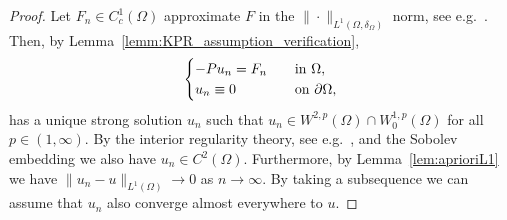 \documentclass[12pt,a4paper]{amsart}
\theoremstyle{definition}
\begin{document}
\begin{proof}
    Let $F_n\in  C^1_c(\Omega)$ approximate $F$ in the $\|\cdot\|_{L^1(\Omega,\delta_\Omega)}$ norm, see e.g.~\cite[Proposition~7.9]{MR1681462}. Then, by Lemma~\ref{lemm:KPR_assumption_verification}, 
    \begin{align*}
        \begin{cases}
            -Pu_n = F_n\quad &{\rm in}\ \Omega,\\
            u_n \equiv 0\quad &{\rm on}\ \partial \Omega,
        \end{cases}
    \end{align*}
    has a unique strong solution $u_n$ such that $u_n\in W^{2,p}(\Omega)\cap W^{1,p}_0(\Omega)$ for all $p\in (1,\infty)$. By the interior regularity theory, see e.g.~\cite[Theorem~9.19]{MR1814364}, and the Sobolev embedding we also have $u_n\in C^2(\Omega)$. Furthermore, by Lemma~\ref{lem:aprioriL1}   we have $\|u_n - u\|_{L^1(\Omega)} \to 0$ as $n\to \infty$. By taking a subsequence we can assume that $u_n$ also converge almost everywhere to $u$. 


\end{proof}
\end{document}
